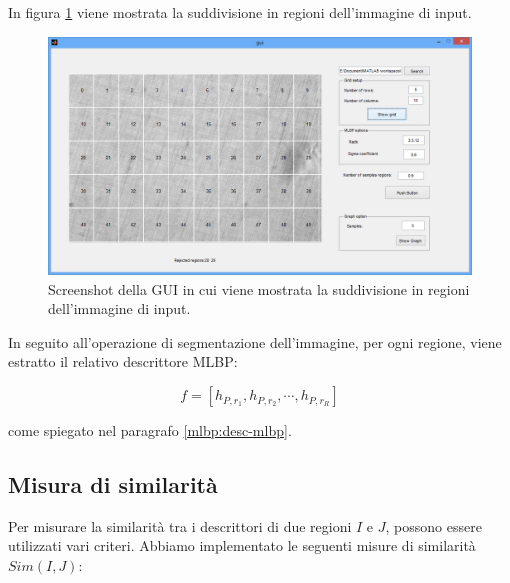 In figura \ref{fig:GUIpreLBP} viene mostrata la suddivisione in regioni dell'immagine di input. \\

\begin{figure}[ht]
\begin{center}
\includegraphics[width=.95\textwidth]{img/gui_pre_lbp}
\caption{ Screenshot della GUI in cui viene mostrata la suddivisione in regioni dell'immagine di input.}
\label{fig:GUIpreLBP}
\end{center}
\end{figure}

In seguito all'operazione di segmentazione dell'immagine, per ogni regione, viene estratto il relativo descrittore \acs{MLBP}:

\begin{equation*}
f = [h_{P, r_{1}}, h_{P, r_{2}}, \cdots, h_{P, r_R}]
\end{equation*}


\noindent come spiegato nel paragrafo \ref{mlbp:desc-mlbp}. 



%	
	



\subsection{Misura di similarità}

Per misurare la similarità tra i descrittori di due regioni $I$ e $J$, possono essere utilizzati vari criteri. Abbiamo implementato le seguenti misure di similarità $Sim(I, J)$:

